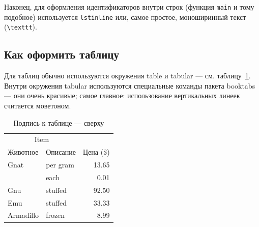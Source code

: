Наконец, для оформления идентификаторов внутри строк
(функция \lstinline{main} и тому подобное) используется
\texttt{lstinline} или, самое простое, моноширинный текст
(\texttt{\textbackslash texttt}).

\subsection{Как оформить таблицу}

Для таблиц обычно используются окружения table и tabular --- см. таблицу~\ref{tab:widgets}. Внутри окружения tabular используются специальные команды пакета booktabs — они очень красивые; самое главное: использование вертикальных линеек считается моветоном.

\begin{table}
\centering
\caption{\label{tab:widgets}Подпись к таблице --- сверху}
\begin{tabular}{llr}
\toprule
\multicolumn{2}{c}{Item} \\
\cmidrule(r){1-2}
Животное  & Описание    & Цена (\$) \\
\midrule
Gnat      & per gram    & 13.65      \\
          & each        & 0.01       \\
Gnu       & stuffed     & 92.50      \\
Emu       & stuffed     & 33.33      \\
Armadillo & frozen      & 8.99       \\
\bottomrule
\end{tabular}
\end{table}

\fi


